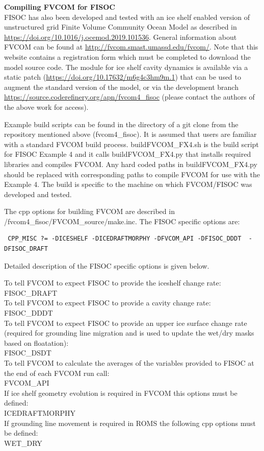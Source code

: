 \documentclass[11pt]{article}
\begin{document}
\textbf{Compiling FVCOM for FISOC} \\
FISOC has also been developed and tested with an ice shelf enabled version of unstructured grid Finite Volume Community Ocean Model as described in \url{https://doi.org/10.1016/j.ocemod.2019.101536}. General information about FVCOM can be found at \url{http://fvcom.smast.umassd.edu/fvcom/}. Note that this website contains a registration form which must be completed to download the model source code. The module for ice shelf cavity dynamics is available via a static patch (\url{https://doi.org/10.17632/m6g4c3hm9m.1}) that can be used to augment the standard version of the model, or via the development branch \url{https://source.coderefinery.org/apn/fvcom4_fisoc} (please contact the authors of the above work for access).


Example build scripts can be found in the directory of a git clone 
from the repository mentioned above (fvcom4\_fisoc). It is assumed that users are familiar with a standard FVCOM build process.  buildFVCOM\_FX4.sh is the build script for FISOC Example 4 and it calls buildFVCOM\_FX4.py that installs required libraries and compiles FVCOM. Any hard coded paths in buildFVCOM\_FX4.py should be replaced with corresponding paths to compile FVCOM for use with the Example 4.  
The build is specific to the machine on which 
FVCOM/FISOC was developed and tested.

The cpp options for building FVCOM are described in /fvcom4\_fisoc/FVCOM\_source/make.inc. The FISOC specific options are:
\begin{lstlisting}
 CPP_MISC ?= -DICESHELF -DICEDRAFTMORPHY -DFVCOM_API -DFISOC_DDDT  -DFISOC_DRAFT
\end{lstlisting}

Detailed description of the FISOC specific options is given below. \begin{flushleft}
To tell FVCOM to expect FISOC to provide the iceshelf change rate:\\
FISOC\_DRAFT\\
To tell FVCOM to expect FISOC to provide a cavity change rate:\\
FISOC\_DDDT\\
To tell FVCOM to expect FISOC to provide an upper ice surface change rate
(required for grounding line migration 
and is used to update the wet/dry masks based on floatation):\\
FISOC\_DSDT\\
To tell FVCOM to calculate the averages of the variables provided to FISOC at 
the end of each FVCOM run call:\\
FVCOM\_API\\
If ice shelf geometry evolution is required in FVCOM this options must be 
defined:\\
ICEDRAFTMORPHY\\
If grounding line movement is required in ROMS the following cpp options 
must be defined:\\
WET\_DRY
\end{flushleft}
\end{document}
